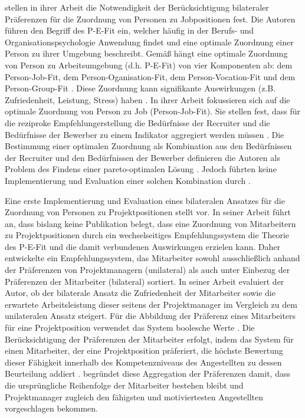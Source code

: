 \textcite[S. 1ff.]{malinowski:2006} stellen in ihrer Arbeit die Notwendigkeit der Berücksichtigung bilateraler Präferenzen für die Zuordnung von Personen zu Jobpositionen fest.
Die Autoren führen den Begriff des \ac{P-E-Fit} ein, welcher häufig in der Berufs- und Organisationspsychologie Anwendung findet \cite[S. 2]{link:booklet} und eine optimale Zuordnung einer Person zu ihrer Umgebung beschreibt.
Gemäß \textcite[S. 1ff.]{malinowski:2006} hängt eine optimale Zuordnung von Person zu Arbeitsumgebung (d.h. \ac{P-E-Fit}) von vier Komponenten ab: dem Person-Job-Fit, dem Person-Oganisation-Fit, dem Per\-son-Vocation-Fit und dem Person-Group-Fit \cite[S. 3]{malinowski:2006}.
Diese Zuordnung kann signifikante Auswirkungen (z.B. Zufriedenheit, Leistung, Stress) haben \cite[S. 83]{su:2015}.
In ihrer Arbeit fokussieren sich \textcite[S. 4]{malinowski:2006} auf die optimale Zuordnung von Person zu Job (Person-Job-Fit).
Sie stellen fest, dass für die reziproke Empfehlungerstellung die Bedürfnisse der Recruiter und die Bedürfnisse der Bewerber zu einem Indikator \cite[S. 922]{siting:2012} aggregiert werden müssen \cite[S. 5]{malinowski:2006}.
Die Bestimmung einer optimalen Zuordnung als Kombination aus den Bedürfnissen der Recruiter und den Bedürfnissen der Bewerber definieren die Autoren als Problem des Findens einer pareto-optimalen Lösung \cite[S. 5]{malinowski:2006}.
Jedoch führten \textcite[S. 1ff.]{malinowski:2006} keine Implementierung und Evaluation einer solchen Kombination durch \cite[S. 549]{koprinska:inbook}.

Eine erste Implementierung und Evaluation eines bilateralen Ansatzes für die Zuordnung von Personen zu Projektpositionen stellt \textcite[S. 1ff.]{link:booklet} vor.
In seiner Arbeit führt \textcite[S. 2]{link:booklet} an, dass bislang keine Publikation belegt, dass eine Zuordnung von Mitarbeitern zu Projektpositionen durch ein wechselseitiges Empfehlungssystem die Theorie des \ac{P-E-Fit} und die damit verbundenen Auswirkungen erzielen kann.
Daher entwickelte \textcite[S. 1ff.]{link:booklet} ein Empfehlungssystem, das Mitarbeiter sowohl ausschließlich anhand der Präferenzen von Projektmanagern (unilateral) als auch unter Einbezug der Präferenzen der Mitarbeiter (bilateral) sortiert.
In seiner Arbeit evaluiert der Autor, ob der bilaterale Ansatz die Zufriedenheit der Mitarbeiter sowie die erwartete Arbeitsleistung dieser seitens der Projektmanager im Vergleich zu dem unilateralen Ansatz steigert.
Für die Abbildung der Präferenz eines Mitarbeiters für eine Projektposition verwendet das System boolesche Werte \cite[S. 69]{link:booklet}.
Die Berücksichtigung der Präferenzen der Mitarbeiter erfolgt, indem das System für einen Mitarbeiter, der eine Projektposition präferiert, die höchste Bewertung dieser Fähigkeit innerhalb des Kompetenzniveaus des Angestellten zu dessen Beurteilung addiert \cite[S. 44]{link:booklet}.
\textcite[S. 44]{link:booklet} begründet diese Aggregation der Präferenzen damit, dass die ursprüngliche Reihenfolge der Mitarbeiter bestehen bleibt und Projektmanager zugleich den fähigsten und motiviertesten Angestellten vorgeschlagen bekommen.

